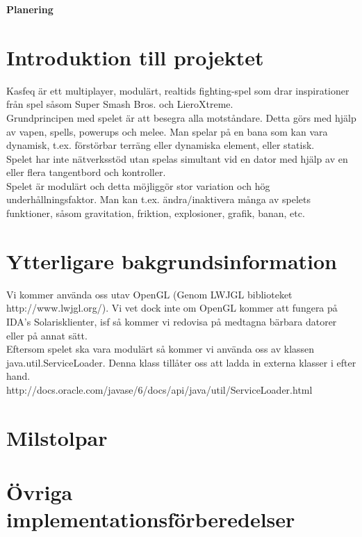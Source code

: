 \begin{center}
   \textbf{\Huge Planering}\\[1cm]
\end{center}
\section{Introduktion till projektet}
Kasfeq är ett multiplayer, modulärt, realtids fighting-spel som drar inspirationer från spel såsom Super Smash Bros. och LieroXtreme.\\
Grundprincipen med spelet är att besegra alla motståndare. Detta görs med hjälp av vapen, spells, powerups och melee. Man spelar på en bana som kan vara dynamisk, t.ex. förstörbar terräng eller dynamiska element, eller statisk.\\
\vspace{11pt}
Spelet har inte nätverksstöd utan spelas simultant vid en dator med hjälp av en eller flera tangentbord och kontroller.\\
\vspace{11pt}
Spelet är modulärt och detta möjliggör stor variation och hög underhållningsfaktor. Man kan t.ex. ändra/inaktivera många av spelets funktioner, såsom gravitation, friktion, explosioner, grafik, banan, etc.\\

\section{Ytterligare bakgrundsinformation}
Vi kommer använda oss utav OpenGL (Genom LWJGL biblioteket http://www.lwjgl.org/). Vi vet dock inte om OpenGL kommer att fungera på IDA's Solarisklienter, isf så kommer vi redovisa på medtagna bärbara datorer eller på annat sätt.\\
\vspace{11pt}
Eftersom spelet ska vara modulärt så kommer vi använda oss av klassen java.util.ServiceLoader. Denna klass tillåter oss att ladda in externa klasser i efter hand.\\
\vspace{11pt}
http://docs.oracle.com/javase/6/docs/api/java/util/ServiceLoader.html
\section{Milstolpar}
\section{Övriga implementationsförberedelser}
